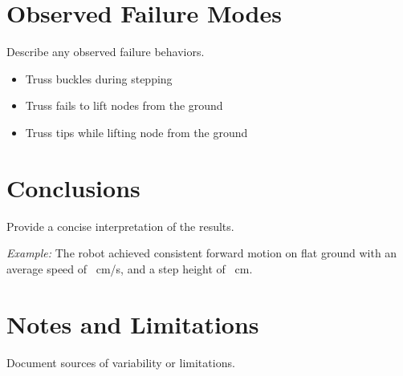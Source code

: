 \documentclass[11pt]{article}
\begin{document}
\section*{Observed Failure Modes}
Describe any observed failure behaviors.

\begin{itemize}[noitemsep]
    \item Truss buckles during stepping
    \item Truss fails to lift nodes from the ground
    \item Truss tips while lifting node from the ground
\end{itemize}

\section*{Conclusions}
Provide a concise interpretation of the results.

\textit{Example:} The robot achieved consistent forward motion on flat ground with an average speed of \underline{\hspace{1 cm}}~cm/s, and a step height of  \underline{\hspace{1 cm}}~cm. 

\section*{Notes and Limitations}
Document sources of variability or limitations.
\end{document}
